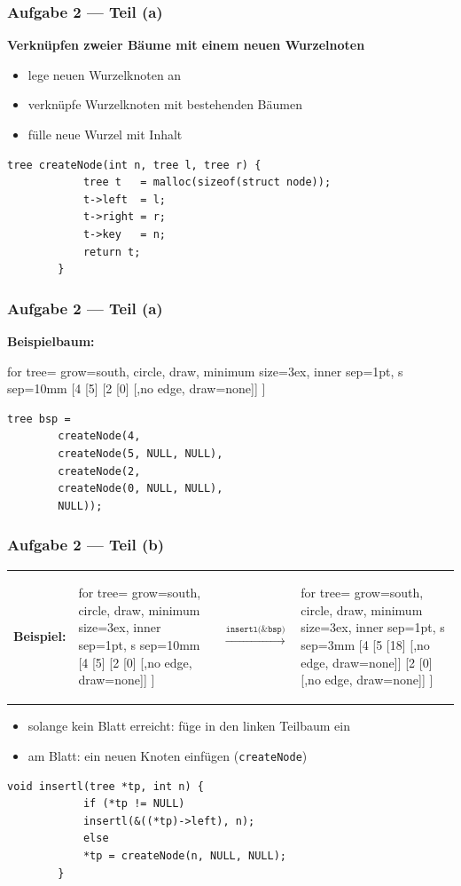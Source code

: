 \documentclass{beamer}
\begin{document}
\begin{frame}[fragile] \frametitle{Aufgabe 2 --- Teil (a)}
	\textbf{Verknüpfen zweier Bäume mit einem neuen Wurzelnoten}
	\pause
	\begin{itemize}
		\item lege neuen Wurzelknoten an
		\item verknüpfe Wurzelknoten mit bestehenden Bäumen
		\item fülle neue Wurzel mit Inhalt
	\end{itemize}
	\pause
	\begin{lstlisting}[style=notebook]
		tree createNode(int n, tree l, tree r) {
			tree t   = malloc(sizeof(struct node));
			t->left  = l;
			t->right = r;
			t->key   = n;
			return t;
		}
	\end{lstlisting}
\end{frame}

\begin{frame}[fragile] \frametitle{Aufgabe 2 --- Teil (a)}
	\textbf{Beispielbaum:}
	\begin{center}
		\begin{forest}
			for tree={ grow=south, circle, draw, minimum size=3ex, inner sep=1pt, s sep=10mm }
			[4 	[5] [2 [0] [,no edge, draw=none]] ]
		\end{forest}
	\end{center}
	\pause
	\begin{lstlisting}[style=notebook]
		tree bsp = 
		createNode(4,
		createNode(5, NULL, NULL),
		createNode(2,
		createNode(0, NULL, NULL),
		NULL));
	\end{lstlisting}
\end{frame}


\begin{frame}[fragile] \frametitle{Aufgabe 2 --- Teil (b)}
	\begin{tabularx}{\linewidth}{m{2cm} m{2cm} m{1.5cm} m{3cm}}
		\textbf{Beispiel:}
		&
		\begin{forest}
			for tree={ grow=south, circle, draw, minimum size=3ex, inner sep=1pt, s sep=10mm }
			[4 	[5] [2 [0] [,no edge, draw=none]] ]
		\end{forest}
		&
		$\overset{\texttt{insertl(\&bsp)}}{\longrightarrow}$
		&
		\begin{forest}
			for tree={ grow=south, circle, draw, minimum size=3ex, inner sep=1pt, s sep=3mm }
			[4 	[5 [18] [,no edge, draw=none]] [2 [0] [,no edge, draw=none]] ]
		\end{forest}
	\end{tabularx}
	\pause
	\begin{itemize}
		\item solange kein Blatt erreicht: füge in den linken Teilbaum ein
		\item am Blatt: ein neuen Knoten einfügen (\texttt{createNode})
	\end{itemize}
	\pause
	\begin{lstlisting}[style=notebook]
		void insertl(tree *tp, int n) {
			if (*tp != NULL)
			insertl(&((*tp)->left), n);
			else
			*tp = createNode(n, NULL, NULL);
		}
	\end{lstlisting}
\end{frame}
\end{document}
